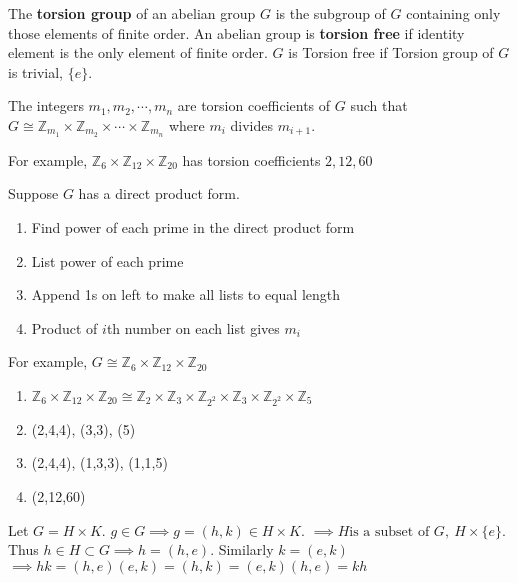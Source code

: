 \begin{definition} 
	The \textbf{torsion group} of an abelian group $G$ is the subgroup of $G$ containing only those elements of finite order.%
	An abelian group is \textbf{torsion free} if identity element is the only element of finite order. $G$ is Torsion free if Torsion group of $G$ is trivial, $\{ e \}$.%
\end{definition}

\begin{definition}
	The integers $m_1,m_2,\cdots,m_n$ are torsion coefficients of $G$ such that $G \cong \mathbb{Z}_{m_1} \times \mathbb{Z}_{m_2} \times \cdots \times \mathbb{Z}_{m_n}$ where $m_i$ divides $m_{i+1}$.%
\end{definition}

For example, $\mathbb{Z}_6 \times \mathbb{Z}_{12} \times \mathbb{Z}_{20}$ has torsion coefficients $2, 12, 60$

\begin{remark} Suppose $G$ has a direct product form.%
	\begin{enumerate}[label=Step \arabic*]
		\item Find power of each prime in the direct product form
		\item List power of each prime
		\item Append 1s on left to make all lists to equal length
		\item Product of $i$th number on each list gives $m_i$
	\end{enumerate}
\end{remark}

For example, $G \cong \mathbb{Z}_6 \times \mathbb{Z}_{12} \times \mathbb{Z}_{20}$
\begin{enumerate}[label=Step \arabic*]
	\item $\mathbb{Z}_6 \times \mathbb{Z}_{12} \times \mathbb{Z}_{20} \cong \mathbb{Z}_2 \times \mathbb{Z}_3 \times \mathbb{Z}_{2^2} \times \mathbb{Z}_3 \times \mathbb{Z}_{2^2} \times \mathbb{Z}_5$
	\item (2,4,4), (3,3), (5)
	\item (2,4,4), (1,3,3), (1,1,5)
	\item (2,12,60)
\end{enumerate}

\begin{remark}
	Let $G = H \times K$. $g \in G \implies g = (h,k) \in H \times K$.%
	$\implies H \text{is a subset of } G,\ H \times \{e\}$.\\
	Thus $h \in H \subset G \implies h = (h,e)$. Similarly $k = (e,k)$\\
	$\implies hk = (h,e)(e,k) = (h,k) = (e,k)(h,e) = kh$
\end{remark}
\pagebreak

